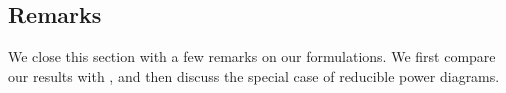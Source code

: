 \documentclass[main.tex]{subfiles}
\begin{document}

\subsection{Remarks}
\label{sec:remarks}

We close this section with a few remarks on our formulations.
We first compare our results with \citet{Bourne2025Inverting, Bourne2026ConvexOrder}, and then discuss the special case of reducible power diagrams.
\end{document}
